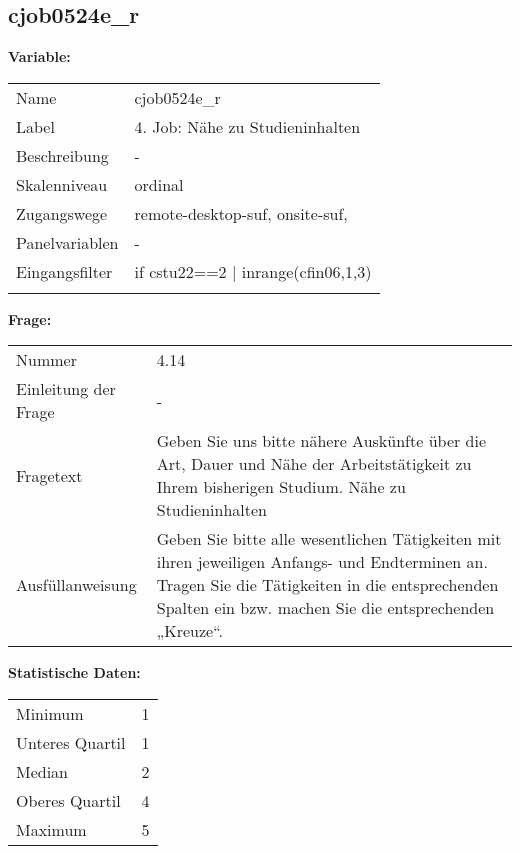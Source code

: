 	
	
	\subsection{cjob0524e\_r}
	\label{subSection:cjob0524e_r}

	\noindent\textbf{Variable:}\\
		\begin{tabular}{lL{11.3cm}}
			\label{tableVariable:cjob0524e_r}
			Name & cjob0524e\_r \\
			Label & 4. Job: Nähe zu Studieninhalten \\
			Beschreibung & - \\
			Skalenniveau & ordinal \\
			Zugangswege &
				remote-desktop-suf,
				onsite-suf,
 \\
			Panelvariablen & -
			 \\
			Eingangsfilter & if cstu22==2 | inrange(cfin06,1,3) \\
 \\
		\end{tabular}

		\vspace*{1 cm}
		\noindent\textbf{Frage:}\\
		\begin{tabular}{lL{11.3cm}}
			\label{tableQuestion:cjob0524e_r}
			Nummer & 4.14 \\
			Einleitung der Frage & - \\
			Fragetext & Geben Sie uns bitte nähere Auskünfte über die Art, Dauer und Nähe der Arbeitstätigkeit zu Ihrem bisherigen Studium.
Nähe zu Studieninhalten \\
			Ausfüllanweisung & Geben Sie bitte alle wesentlichen Tätigkeiten mit ihren jeweiligen Anfangs- und Endterminen an. Tragen Sie die Tätigkeiten in die entsprechenden Spalten ein bzw. machen Sie die entsprechenden „Kreuze“. \\
		\end{tabular}


		\vspace*{1 cm}
		\noindent\textbf{Statistische Daten:}\\
			\begin{tabular}{ll}
				\label{tableStatistics:cjob0524e_r}
					Minimum & 1 \\
					Unteres Quartil & 1 \\
					Median & 2 \\
					Oberes Quartil & 4 \\
					Maximum & 5 \\
			\end{tabular}



